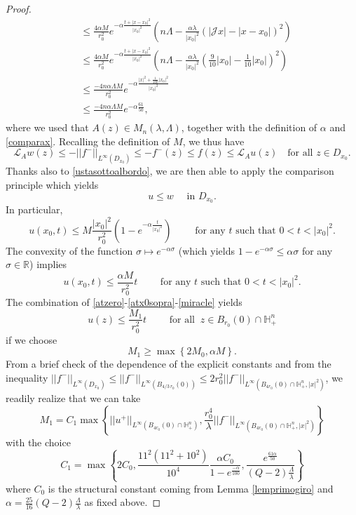 \documentclass[10pt,a4paper]{amsart}
\def \H {{\mathbb H}}
\def \L {\mathcal{L}}
\newcommand{\J}{\mathcal{J}}
\newcommand{\R}{{\mathbb R}}
\begin{document}
\begin{proof}
\begin{align*}
& \leq \frac{4\alpha M}{r_0^2}e^{-\alpha\frac{t+|x-x_0|^2}{|x_0|^2}}\left( n\Lambda -\frac{\alpha\lambda}{|x_0|^2}\left( |\J x| - |x-x_0|\right)^2 \right)\\
&\leq \frac{4\alpha M}{r_0^2}e^{-\alpha\frac{t+|x-x_0|^2}{|x_0|^2}}\left( n\Lambda -\frac{\alpha\lambda}{|x_0|^2}\left( \frac{9}{10}|x_0| -  \frac{1}{10}|x_0|\right)^2 \right)\\
& \leq \frac{-4n\alpha\Lambda M}{r_0^2}e^{-\alpha\frac{|x|^2+\frac{1}{100}|x_0|^2}{|x_0|^2}} \\
& \leq \frac{-4n\alpha\Lambda M}{r_0^2}e^{-\alpha\frac{61}{50}},
\end{align*}
where we used that $A(z) \in M_n(\lambda, \Lambda)$, together with the definition of $\alpha$ and \eqref{comparax}. Recalling the definition of $M$, we thus have
$$
\L_A w (z)\leq -||f^-||_{L^\infty(D_{x_0})} \leq -f^-(z)\leq f(z)\leq \L_A u (z)
 \quad \text{for all } z \in D_{x_0}.$$
Thanks also to \eqref{ustasottoalbordo}, we are then able to apply the comparison principle which yields
$$
u\leq w \quad \mbox{ in }D_{x_0}.
$$
In particular,
$$
u(x_0,t)\leq M \frac{|x_0|^2}{r_0^2}\left(1-e^{-\alpha\frac{t}{|x_0|^2}}\right)\qquad\mbox{ for any }t\mbox{ such that }0<t<|x_0|^2.
$$
The convexity of the function $\sigma\mapsto e^{-\alpha\sigma}$ (which yields $1-e^{-\alpha\sigma}\leq \alpha\sigma$ for any $\sigma\in\R$) implies
\begin{equation}\label{miracle}
u(x_0,t)\leq \frac{\alpha M}{r_0^2} t\qquad\mbox{ for any }t\mbox{ such that }0<t<|x_0|^2.
\end{equation}
The combination of \eqref{atzero}-\eqref{atx0sopra}-\eqref{miracle} yields
$$
u(z)\leq \frac{M_1}{r^2_0} t \qquad \text{ for all } \ z \in B_{r_0}(0)\cap \H^n_+
$$
if we choose
$$M_1\geq\max\left\{ 2M_0, \alpha M \right\}.$$
From a brief check of the dependence of the explicit constants and from the inequality $ ||f^-||_{L^\infty(D_{x_0})}\leq ||f^-||_{L^\infty(B_{4/3\, r_0}(0))}\leq 2 r^2_0 ||f^-||_{L^{\infty}(B_{4r_0}(0)\cap\H^n_+,|x|^2)}$, we readily realize that we can take
$$M_1=C_1\max\left\{ ||u^+||_{L^{\infty}(B_{4r_0}(0)\cap\H^n_+)}, 
\frac{r_0^4}{\lambda}||f^-||_{L^{\infty}(B_{4r_0}(0)\cap\H^n_+,|x|^2)}\right\}$$
with the choice 
$$C_1=\max\left\{ 2C_0, \frac{11^2(11^2+10^2)}{10^4} \frac{\alpha C_0}{1- e^{\frac{-\alpha}{100}}}, \frac{e^{\frac{61\alpha}{50}}}{(Q-2)\frac{\Lambda}{\lambda}} \right\}$$
where $C_0$ is the structural constant coming from Lemma \ref{lemprimogiro} and $\alpha=\frac{25}{16}(Q-2)\frac{\Lambda}{\lambda}$ as fixed above.
\end{proof}
\end{document}
